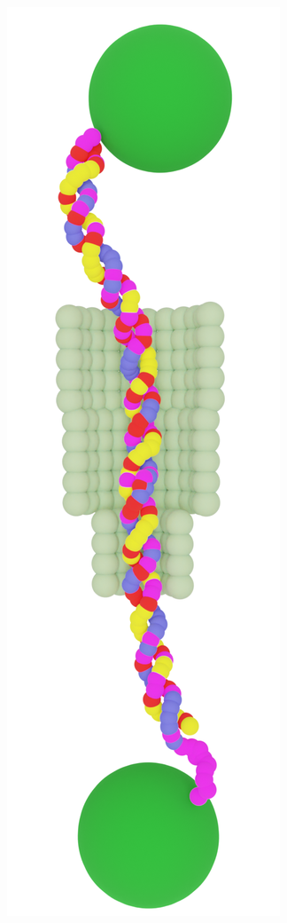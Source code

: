 \begin{figure}[ht!]
\begin{centering}
\begin{subfigure}[t]{\dimexpr.21\linewidth-1.3em\relax}
  \centering
  \vspace{-0.5cm}
  \includegraphics[width=.4\linewidth,valign=t]{Figures/Rotaxane-90.png}
  \end{subfigure}
  \label{fig:test}
  \end{centering}

  \vspace{.4cm}


\end{figure}
